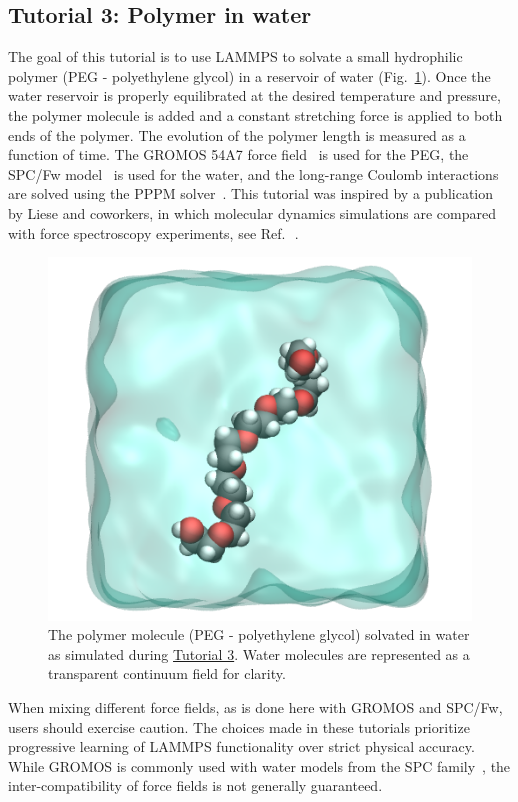 \documentclass[9pt,tutorial]{livecoms}
\begin{document}
\subsection{Tutorial 3: Polymer in water}
\label{all-atom-label}

The goal of this tutorial is to use LAMMPS to solvate a small
hydrophilic polymer (PEG - polyethylene glycol) in a reservoir of water
(Fig.~\ref{fig:PEG}).  Once the water reservoir is properly equilibrated
at the desired temperature and pressure, the polymer molecule is added
and a constant stretching force is applied to both ends of the polymer.
The evolution of the polymer length is measured as a function of time.
The {GROMOS} 54A7 force field~\cite{schmid2011definition} is used for the
PEG, the SPC/Fw model~\cite{wu2006flexible} is used for the water, and
the long-range Coulomb interactions are solved using the PPPM
solver~\cite{luty1996calculating}.  This tutorial was inspired by a
publication by Liese and coworkers, in which molecular dynamics
simulations are compared with force spectroscopy experiments, see
Ref.\,~.

\begin{figure}
\centering
\includegraphics[width=0.55\linewidth]{PEG}
\caption{The polymer molecule (PEG - polyethylene glycol) solvated in water as
simulated during \hyperref[all-atom-label]{Tutorial 3}.  Water molecules are
represented as a transparent continuum field for clarity.}
\label{fig:PEG}
\end{figure}

\begin{note}
{\color{blue}When mixing different force fields, as is done here with GROMOS 
and SPC/Fw, users should exercise caution.  The choices made in these tutorials 
prioritize progressive learning of LAMMPS functionality 
over strict physical accuracy.  While GROMOS is commonly used with water 
models from the SPC family~\cite{oostenbrink2004biomolecular}, 
the inter-compatibility of force fields is not generally guaranteed.}
\end{note}
\end{document}
